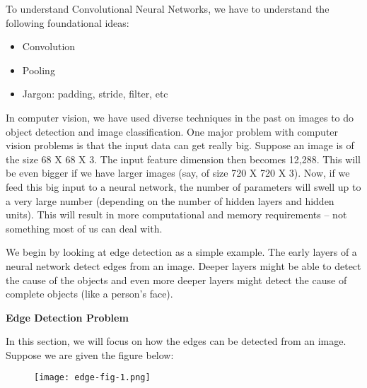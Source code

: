 \doublespacing
\setlength{\parindent}{1cm}

To understand Convolutional Neural Networks, we have to understand the following foundational ideas:

\begin{itemize}
  \item Convolution
  \item Pooling
  \item Jargon: padding, stride, filter, etc
\end{itemize}

In computer vision, we have used diverse techniques in the past on images to do object detection and image classification. One major problem with computer vision problems is that the input data can get really big. Suppose an image is of the size 68 X 68 X 3. The input feature dimension then becomes 12,288. This will be even bigger if we have larger images (say, of size 720 X 720 X 3). Now, if we feed this big input to a neural network, the number of parameters will swell up to a very large number (depending on the number of hidden layers and hidden units). This will result in more computational and memory requirements – not something most of us can deal with. \par

We begin by looking at edge detection as a simple example. The early layers of a neural network detect edges from an image. Deeper layers might be able to detect the cause of the objects and even more deeper layers might detect the cause of complete objects (like a person’s face). \par

\textbf{Edge Detection Problem}

In this section, we will focus on how the edges can be detected from an image. Suppose we are given the figure below:

\begin{figure}
  \texttt{[image: edge-fig-1.png]}
\end{figure}
